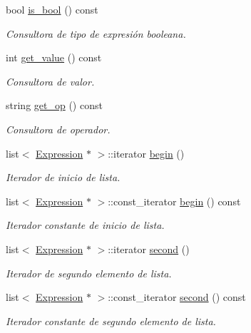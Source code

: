 \begin{DoxyCompactItemize}
bool \hyperlink{class_expression_ad42c70dcee3b195c77749ca6435c244d}{is\+\_\+bool} () const 
\begin{DoxyCompactList}\small\item\em Consultora de tipo de expresión booleana. \end{DoxyCompactList}\item 
int \hyperlink{class_expression_add3f908cb67ed993a5e886447fd70df0}{get\+\_\+value} () const 
\begin{DoxyCompactList}\small\item\em Consultora de valor. \end{DoxyCompactList}\item 
string \hyperlink{class_expression_a9216cba5bbd3ffa8c3a625a66b91b36f}{get\+\_\+op} () const 
\begin{DoxyCompactList}\small\item\em Consultora de operador. \end{DoxyCompactList}\item 
list$<$ \hyperlink{class_expression}{Expression} $\ast$ $>$\+::iterator \hyperlink{class_expression_a661b791a6d4e4a021c9a750022a14a1f}{begin} ()
\begin{DoxyCompactList}\small\item\em Iterador de inicio de lista. \end{DoxyCompactList}\item 
list$<$ \hyperlink{class_expression}{Expression} $\ast$ $>$\+::const\+\_\+iterator \hyperlink{class_expression_a7123f941d21c1df138a5b7f57c6d2551}{begin} () const 
\begin{DoxyCompactList}\small\item\em Iterador constante de inicio de lista. \end{DoxyCompactList}\item 
list$<$ \hyperlink{class_expression}{Expression} $\ast$ $>$\+::iterator \hyperlink{class_expression_a3b913933fee73a1b4d0b1f789bb923f0}{second} ()
\begin{DoxyCompactList}\small\item\em Iterador de segundo elemento de lista. \end{DoxyCompactList}\item 
list$<$ \hyperlink{class_expression}{Expression} $\ast$ $>$\+::const\+\_\+iterator \hyperlink{class_expression_aff6f7f473a82f8784e7df9028e748ae4}{second} () const 
\begin{DoxyCompactList}\small\item\em Iterador constante de segundo elemento de lista. \end{DoxyCompactList}\item 

\end{DoxyCompactItemize}
